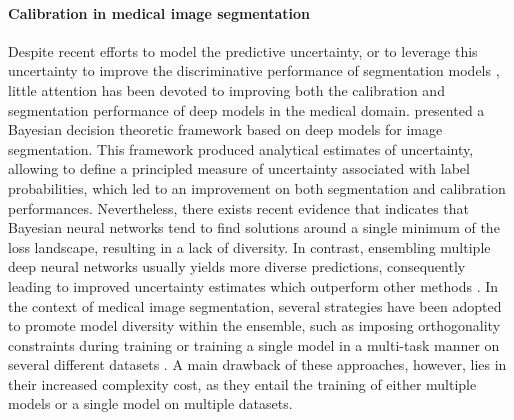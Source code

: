 \documentclass[twocolumn,final,10pt]{elsarticle}
\newcommand{\rev}[1]{{\color{black}#1}}
\begin{document}
\rev{\paragraph{\textbf{Calibration in medical image segmentation}} Despite recent efforts to model the predictive uncertainty, or to leverage this uncertainty to improve the discriminative performance of segmentation models \citep{wang2019aleatoric}, little attention has been devoted to improving both the calibration and segmentation performance of deep models in the medical domain. %
\citep{jena2019bayesian} presented a Bayesian decision theoretic framework based on deep models for image segmentation. This framework produced analytical estimates of uncertainty, allowing to define a principled measure of uncertainty associated with label probabilities, which led to an improvement on both segmentation and calibration performances. Nevertheless, there exists recent evidence \citep{fort2019deep} that indicates that Bayesian neural networks tend to find solutions around a single minimum of the loss landscape, resulting in a lack of diversity. In contrast, ensembling multiple deep neural networks usually yields more diverse predictions, consequently leading to improved uncertainty estimates which outperform other methods \citep{jungo2020analyzing,mehrtash2020confidence}. In the context of medical image segmentation, several strategies have been adopted to promote model diversity within the ensemble, such as imposing orthogonality constraints during training \citep{larrazabal2021orthogonal} or training a single model in a multi-task manner on several different datasets \citep{karimi2022improving}. A main drawback of these approaches, however, lies in their increased complexity cost, as they entail the training of either multiple models or a single model on multiple datasets.}
\end{document}
